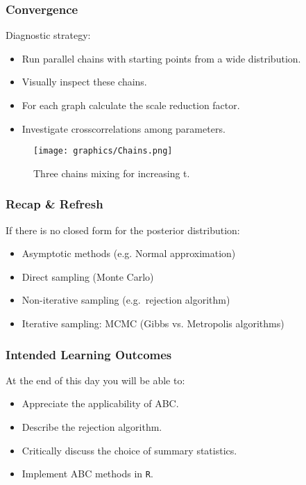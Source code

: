 \documentclass{beamer}
\newcommand{\1}{\ensuremath{\mathbf{1}}}
\begin{document}
%
%
%
\begin{frame}\frametitle{Convergence}
	Diagnostic strategy:
	\begin{itemize}
		\item Run parallel chains with starting points from a wide distribution.
		\item Visually inspect these chains.
		\item For each graph calculate the scale reduction factor.
		\item Investigate crosscorrelations among parameters.
	\end{itemize}
	\begin{figure}
	\begin{center}
		\texttt{[image: graphics/Chains.png]}
	\end{center}
	\caption{Three chains mixing for increasing t.}
	\end{figure}
\end{frame}
%
%
%
\begin{frame}\frametitle{Recap \& Refresh}
	If there is no closed form for the posterior distribution:
	\begin{itemize}
		\item Asymptotic methods (e.g. Normal approximation)
		\item Direct sampling (Monte Carlo)
		\item Non-iterative sampling (e.g.\ rejection algorithm)
		\item Iterative sampling: MCMC (Gibbs vs. Metropolis algorithms)
	\end{itemize}
\end{frame}
%
%
%
\begin{frame}\frametitle{Intended Learning Outcomes}
	At the end of this day you will be able to:
	\begin{itemize}
		\item Appreciate the applicability of ABC.
		\item Describe the rejection algorithm.
		\item Critically discuss the choice of summary statistics.
		\item Implement ABC methods in \texttt{R}.
	\end{itemize}
\end{frame}
\end{document}
